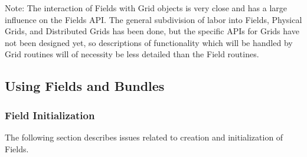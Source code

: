 Note: The interaction of Fields with Grid objects is very close
and has a large influence on the Fields API.  The general
subdivision of labor into Fields, Physical Grids, and
Distributed Grids has been done, but the specific APIs for
Grids have not been designed yet, so descriptions of 
functionality which will be handled by Grid routines 
will of necessity be less detailed than the Field routines.

\subsection{Using Fields and Bundles}

\subsubsection{Field Initialization}

The following section describes issues related to
creation and initialization of Fields.


